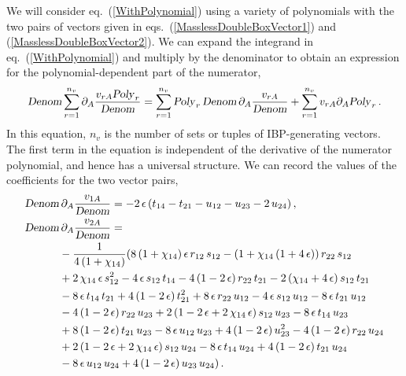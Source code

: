 \documentclass[aps,prd,preprint,groupedaddress,nofootinbib,showpacs,eqsecnum]{revtex4}
\def\eqn#1{eq.~(\ref{#1})}
\def\eqns#1#2{eqs.~(\ref{#1}) and (\ref{#2})}
\def\eps{\epsilon}
\begin{document}
We will consider \eqn{WithPolynomial} using
a variety of polynomials with the two pairs of vectors given
in \eqns{MasslessDoubleBoxVector1}{MasslessDoubleBoxVector2}.
We can expand the integrand in \eqn{WithPolynomial} and multiply by the
denominator to obtain an expression for the polynomial-dependent part
of the numerator,
\begin{equation}
\textsl{Denom\/} \sum_{r=1}^{n_v} \partial_A \frac{v_{rA} \textsl{Poly\/}_r}
{\textsl{Denom\/}}
= \sum_{r=1}^{n_v} \textsl{Poly\/}_r \,\textsl{Denom\/}{}\, \partial_A \frac{v_{rA}}
{\textsl{Denom\/}}
+ \sum_{r=1}^{n_v} v_{rA} \partial_A \textsl{Poly\/}_r\,.
\label{VDeveloped}
\end{equation}
In this equation, $n_v$ is the number of sets or tuples of IBP-generating
vectors.
The first term in the equation is independent of the derivative
of the numerator
polynomial, and hence has a universal structure.
We can record the values of the coefficients for the two vector pairs,
\begin{equation}
\begin{aligned}
\Denom&\, \partial_A\frac{v_{1A}}{\Denom}
=
-2\,\eps\,(t_{14}-t_{21}-u_{12}-u_{23}-2\,u_{24})
\,,\\
\Denom&\, \partial_A\frac{v_{2A}}{\Denom}
=\\
&
-\frac{1}{4\,(1+\chi_{14})} (8\,(1+\chi_{14})\,\eps\,r_{12}\,s_{12}
-(1+\chi_{14}\,(1+4\,\eps))\,r_{22}\,s_{12}
\\ &
+2\,\chi_{14}\,\eps\,s_{12}^{2}
-4\,\eps\,s_{12}\,t_{14}
-4\,(1-2\,\eps)\,r_{22}\,t_{21}
-2\,(\chi_{14}+4\,\eps)\,s_{12}\,t_{21}
\\ &
-8\,\eps\,t_{14}\,t_{21}+4\,(1-2\,\eps)\,t_{21}^{2}
+8\,\eps\,r_{22}\,u_{12}-4\,\eps\,s_{12}\,u_{12}
-8\,\eps\,t_{21}\,u_{12}
\\ &
-4\,(1-2\,\eps)\,r_{22}\,u_{23}
+2\,(1-2\,\eps+2\,\chi_{14}\,\eps)\,s_{12}\,u_{23}
-8\,\eps\,t_{14}\,u_{23}
\\ &
+8\,(1-2\,\eps)\,t_{21}\,u_{23}
-8\,\eps\,u_{12}\,u_{23}+4\,(1-2\,\eps)\,u_{23}^{2}
-4\,(1-2\,\eps)\,r_{22}\,u_{24}
\\ &
+2\,(1-2\,\eps+2\,\chi_{14}\,\eps)\,s_{12}\,u_{24}
-8\,\eps\,t_{14}\,u_{24}+4\,(1-2\,\eps)\,t_{21}\,u_{24}
\\ &
-8\,\eps\,u_{12}\,u_{24}+4\,(1-2\,\eps)\,u_{23}\,u_{24})
\,.
\end{aligned}
\label{PolyIndependentPrefactor}
\end{equation}
\end{document}
